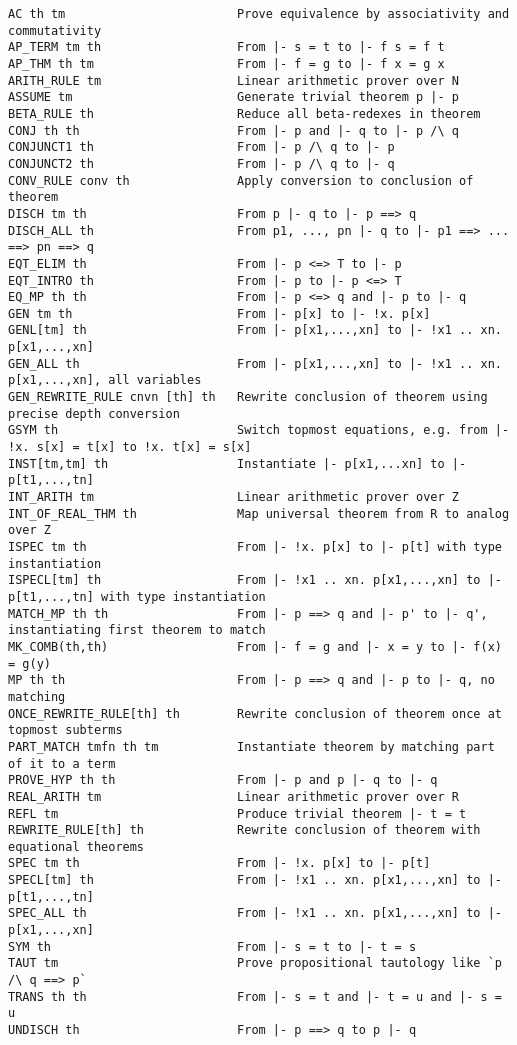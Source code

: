 \documentclass{llncs}
\begin{document}
\begingroup
\scriptsize
\begin{verbatim}
AC th tm                        Prove equivalence by associativity and commutativity
AP_TERM tm th                   From |- s = t to |- f s = f t
AP_THM th tm                    From |- f = g to |- f x = g x
ARITH_RULE tm                   Linear arithmetic prover over N
ASSUME tm                       Generate trivial theorem p |- p
BETA_RULE th                    Reduce all beta-redexes in theorem
CONJ th th                      From |- p and |- q to |- p /\ q
CONJUNCT1 th                    From |- p /\ q to |- p
CONJUNCT2 th                    From |- p /\ q to |- q
CONV_RULE conv th               Apply conversion to conclusion of theorem
DISCH tm th                     From p |- q to |- p ==> q
DISCH_ALL th                    From p1, ..., pn |- q to |- p1 ==> ... ==> pn ==> q
EQT_ELIM th                     From |- p <=> T to |- p
EQT_INTRO th                    From |- p to |- p <=> T
EQ_MP th th                     From |- p <=> q and |- p to |- q
GEN tm th                       From |- p[x] to |- !x. p[x]
GENL[tm] th                     From |- p[x1,...,xn] to |- !x1 .. xn. p[x1,...,xn]
GEN_ALL th                      From |- p[x1,...,xn] to |- !x1 .. xn. p[x1,...,xn], all variables
GEN_REWRITE_RULE cnvn [th] th   Rewrite conclusion of theorem using precise depth conversion
GSYM th                         Switch topmost equations, e.g. from |- !x. s[x] = t[x] to !x. t[x] = s[x]
INST[tm,tm] th                  Instantiate |- p[x1,...xn] to |- p[t1,...,tn]
INT_ARITH tm                    Linear arithmetic prover over Z
INT_OF_REAL_THM th              Map universal theorem from R to analog over Z
ISPEC tm th                     From |- !x. p[x] to |- p[t] with type instantiation
ISPECL[tm] th                   From |- !x1 .. xn. p[x1,...,xn] to |- p[t1,...,tn] with type instantiation
MATCH_MP th th                  From |- p ==> q and |- p' to |- q', instantiating first theorem to match
MK_COMB(th,th)                  From |- f = g and |- x = y to |- f(x) = g(y)
MP th th                        From |- p ==> q and |- p to |- q, no matching
ONCE_REWRITE_RULE[th] th        Rewrite conclusion of theorem once at topmost subterms
PART_MATCH tmfn th tm           Instantiate theorem by matching part of it to a term
PROVE_HYP th th                 From |- p and p |- q to |- q
REAL_ARITH tm                   Linear arithmetic prover over R
REFL tm                         Produce trivial theorem |- t = t
REWRITE_RULE[th] th             Rewrite conclusion of theorem with equational theorems
SPEC tm th                      From |- !x. p[x] to |- p[t]
SPECL[tm] th                    From |- !x1 .. xn. p[x1,...,xn] to |- p[t1,...,tn]
SPEC_ALL th                     From |- !x1 .. xn. p[x1,...,xn] to |- p[x1,...,xn]
SYM th                          From |- s = t to |- t = s
TAUT tm                         Prove propositional tautology like `p /\ q ==> p`
TRANS th th                     From |- s = t and |- t = u and |- s = u
UNDISCH th                      From |- p ==> q to p |- q
\end{verbatim}
\endgroup
\end{document}
